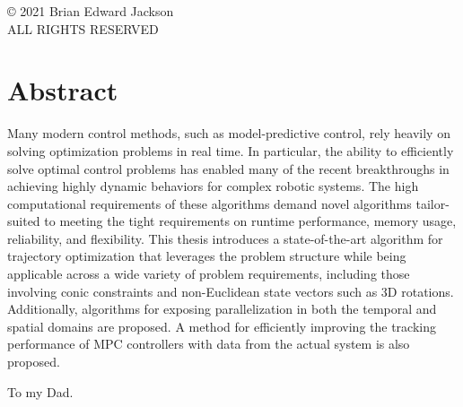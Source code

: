 \documentclass[10pt,oneside]{book}
\begin{document}
    

    \frontmatter
    
    \newpage
    \pagestyle{empty}
    \begin{center}
    \copyright{} 2021 Brian Edward Jackson \\
    ALL RIGHTS RESERVED
    \end{center}
    
    \chapter*{Abstract}
    Many modern control methods, such as model-predictive control, rely heavily
    on solving optimization problems in real time. In particular, the ability to
    efficiently solve optimal control problems has enabled many of the recent
    breakthroughs in achieving highly dynamic behaviors for complex robotic
    systems. The high computational requirements of these algorithms demand novel
    algorithms tailor-suited to meeting the tight requirements on runtime
    performance, memory usage, reliability, and flexibility. This thesis
    introduces a state-of-the-art algorithm for trajectory optimization that
    leverages the problem structure while being applicable across a wide variety
    of problem requirements, including those involving conic constraints and
    non-Euclidean state vectors such as 3D rotations. Additionally, algorithms for 
    exposing parallelization in both the temporal and spatial domains are proposed.
    A method for efficiently improving the tracking performance of MPC controllers with 
    data from the actual system is also proposed.


    \pagebreak
    \hspace{0pt}
    \vfill
    \begin{center}
    To my Dad.
    \end{center}
    \vfill
    \hspace{0pt}
    \pagebreak
\end{document}
